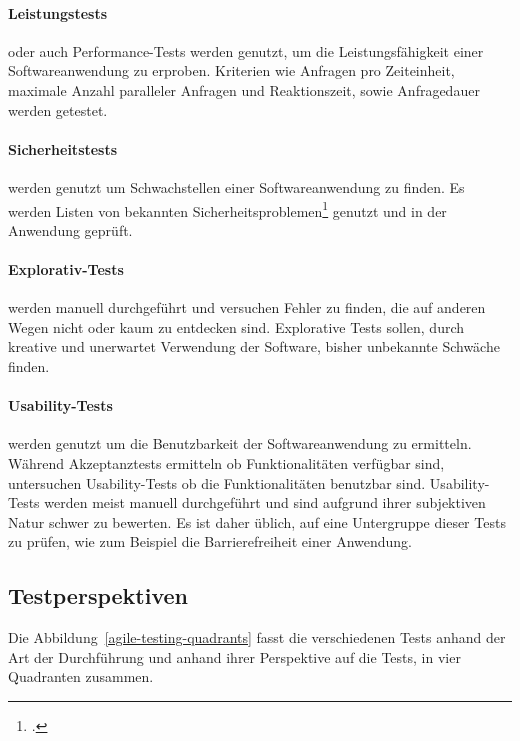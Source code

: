 \paragraph{Leistungstests} oder auch Performance-Tests werden genutzt, um die Leistungsfähigkeit einer Softwareanwendung zu erproben. Kriterien wie Anfragen pro Zeiteinheit, maximale Anzahl paralleler Anfragen und Reaktionszeit, sowie Anfragedauer werden getestet.

\paragraph{Sicherheitstests} werden genutzt um Schwachstellen einer Softwareanwendung zu finden. Es werden Listen von bekannten Sicherheitsproblemen\footcite[vgl.][]{owasp-vulnerability} genutzt und in der Anwendung geprüft.

\paragraph{Explorativ-Tests} werden manuell durchgeführt und versuchen Fehler zu finden, die auf anderen Wegen nicht oder kaum zu entdecken sind. Explorative Tests sollen, durch kreative und unerwartet Verwendung der Software, bisher unbekannte Schwäche finden.

\paragraph{Usability-Tests} werden genutzt um die Benutzbarkeit der Softwareanwendung zu ermitteln. Während Akzeptanztests ermitteln ob Funktionalitäten verfügbar sind, untersuchen Usability-Tests ob die Funktionalitäten benutzbar sind. Usability-Tests werden meist manuell durchgeführt und sind aufgrund ihrer subjektiven Natur schwer zu bewerten. Es ist daher üblich, auf eine Untergruppe dieser Tests zu prüfen, wie zum Beispiel die Barrierefreiheit einer Anwendung.

\subsection{Testperspektiven}

Die Abbildung~\ref{agile-testing-quadrants} fasst die verschiedenen Tests anhand der Art der Durchführung und anhand ihrer Perspektive auf die Tests, in vier Quadranten zusammen.

